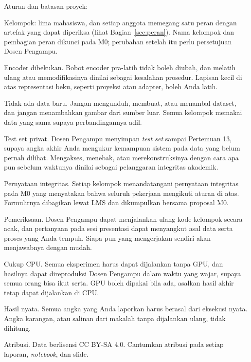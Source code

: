 \documentclass[12pt, a4paper]{article}
\begin{document}
\begin{minipage}{\linewidth}
\begin{bclogo}[couleur=ctpBase, arrondi=0.1, logo=\bccrayon, ombre=false, couleurBord=ctpSurface, epBord=0.6]{Aturan dan batasan proyek:}
  \begin{coloredPen}
    \item Kelompok: lima mahasiswa, dan setiap anggota memegang satu peran dengan artefak yang dapat diperiksa (lihat Bagian~\ref{sec:peran}). Nama kelompok dan pembagian peran dikunci pada M0; perubahan setelah itu perlu persetujuan Dosen Pengampu.
    \item Encoder dibekukan. Bobot encoder pra-latih tidak boleh diubah, dan melatih ulang atau memodifikasinya dinilai sebagai kesalahan prosedur. Lapisan kecil di atas representasi beku, seperti proyeksi atau adapter, boleh Anda latih.
    \item Tidak ada data baru. Jangan mengunduh, membuat, atau menambal dataset, dan jangan menambahkan gambar dari sumber luar. Semua kelompok memakai data yang sama supaya perbandingannya adil.
    \item Test set privat. Dosen Pengampu menyimpan \emph{test set} sampai Pertemuan 13, supaya angka akhir Anda mengukur kemampuan sistem pada data yang belum pernah dilihat. Mengakses, menebak, atau merekonstruksinya dengan cara apa pun sebelum waktunya dinilai sebagai pelanggaran integritas akademik.
    \item Pernyataan integritas. Setiap kelompok menandatangani pernyataan integritas pada M0 yang menyatakan bahwa seluruh pekerjaan mengikuti aturan di atas. Formulirnya dibagikan lewat LMS dan dikumpulkan bersama proposal M0.
    \item Pemeriksaan. Dosen Pengampu dapat menjalankan ulang kode kelompok secara acak, dan pertanyaan pada sesi presentasi dapat menyangkut asal data serta proses yang Anda tempuh. Siapa pun yang mengerjakan sendiri akan menjawabnya dengan mudah.
    \item Cukup CPU. Semua eksperimen harus dapat dijalankan tanpa GPU, dan hasilnya dapat direproduksi Dosen Pengampu dalam waktu yang wajar, supaya semua orang bisa ikut serta. GPU boleh dipakai bila ada, asalkan hasil akhir tetap dapat dijalankan di CPU.
    \item Hasil nyata. Semua angka yang Anda laporkan harus berasal dari eksekusi nyata. Angka karangan, atau salinan dari makalah tanpa dijalankan ulang, tidak dihitung.
    \item Atribusi. Data berlisensi CC BY-SA 4.0. Cantumkan atribusi pada setiap laporan, \emph{notebook}, dan slide.
  \end{coloredPen}
\end{bclogo}
\end{minipage}
\end{document}
